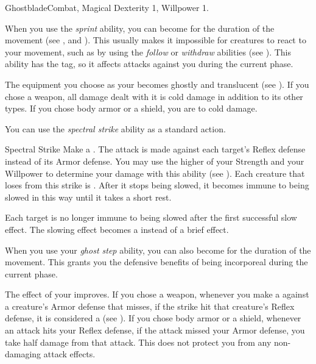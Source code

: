     \begin{feat}{Ghostblade}{Combat, Magical}
        \featpre Dexterity 1, Willpower 1.

         When you use the \textit{sprint} ability, you can become  for the duration of the movement (see , and ).
        This usually makes it impossible for creatures to react to your movement, such as by using the \textit{follow} or \textit{withdraw} abilities (see ).
        This ability has the  tag, so it affects attacks against you during the current phase.

         The equipment you choose as your  becomes ghostly and translucent (see ).
        If you chose a weapon, all damage dealt with it is cold damage in addition to its other types.
        If you chose body armor or a shield, you are  to cold damage.

         You can use the \textit{spectral strike} ability as a standard action.
        \begin{durationability}{Spectral Strike}
            \rankline
            Make a .
            The attack is made against each target's Reflex defense instead of its Armor defense.
            You may use the higher of your Strength and your Willpower to determine your damage with this ability (see ).
            Each creature that loses  from this strike is  \slowed.
            After it stops being slowed, it becomes immune to being slowed in this way until it takes a short rest.

            \rankline
             Each target is no longer immune to being slowed after the first successful slow effect.
             The slowing effect becomes a  instead of a brief effect.
        \end{durationability}

         When you use your \textit{ghost step} ability, you can also become  for the duration of the movement.
        This grants you the defensive benefits of being incorporeal during the current phase.

         The effect of your  improves.
        If you chose a weapon, whenever you make a  against a creature's Armor defense that misses, if the strike hit that creature's Reflex defense, it is considered a  (see ).
        If you chose body armor or a shield, whenever an attack hits your Reflex defense, if the attack missed your Armor defense, you take half damage from that attack.
        This does not protect you from any non-damaging attack effects.


\end{feat}
